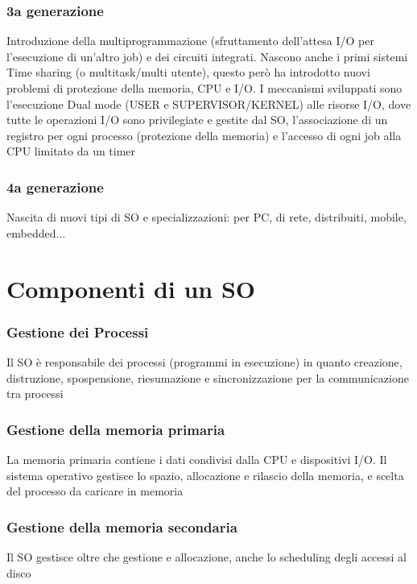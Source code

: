 \documentclass[12pt, a4paper]{article}
\begin{document}
\subsubsection{3a generazione}
Introduzione della multiprogrammazione (sfruttamento dell'attesa I/O per l'esecuzione di un'altro job) e dei 
circuiti integrati. Nascono anche i primi sistemi Time sharing (o multitask/multi utente), questo però ha introdotto
nuovi problemi di protezione della memoria, CPU e I/O. I meccanismi sviluppati sono l'esecuzione Dual mode (USER e 
SUPERVISOR/KERNEL) alle risorse I/O, dove tutte le operazioni I/O sono privilegiate e gestite dal SO, l'associazione
di un registro per ogni processo (protezione della memoria) e l'accesso di ogni job alla CPU limitato da un timer

\subsubsection{4a generazione}
Nascita di nuovi tipi di SO e specializzazioni: per PC, di rete, distribuiti, mobile, embedded... 



\newpage
\section{Componenti di un SO}

\subsubsection{Gestione dei Processi}
Il SO è responsabile dei processi (programmi in esecuzione) in quanto creazione, distruzione, spospensione, 
riesumazione e sincronizzazione per la communicazione tra processi

\subsubsection{Gestione della memoria primaria}
La memoria primaria contiene i dati condivisi dalla CPU e dispositivi I/O. Il sistema operativo gestisce lo 
spazio, allocazione e rilascio della memoria, e scelta del processo da caricare in memoria

\subsubsection{Gestione della memoria secondaria}
Il SO gestisce oltre che gestione e allocazione, anche lo scheduling degli accessi al disco
\end{document}
